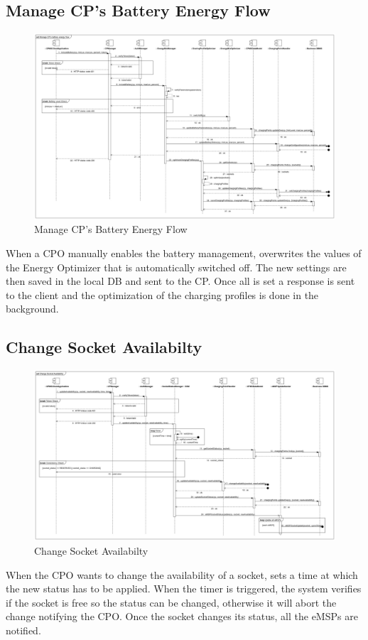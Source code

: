 \documentclass{Configuration_Files/PoliMi3i_thesis}
\begin{document}
\subsection{Manage CP's Battery Energy Flow}
\begin{figure}[H]
    \centering
    \includegraphics[width=1\textwidth]{Images/sequenceDiagrams/Manage CP battery energy flow.jpg}
    \caption{Manage CP's Battery Energy Flow}
\end{figure}
When a CPO manually enables the battery management, overwrites the values of the Energy Optimizer that is automatically switched off. The new settings are then saved in the local DB and sent to the CP. Once all is set a response is sent to the client and the optimization of the charging profiles is done in the background.

\subsection{Change Socket Availabilty}
\begin{figure}[H]
    \centering
    \includegraphics[width=1\textwidth]{Images/sequenceDiagrams/Change Socket Availability.jpg}
    \caption{Change Socket Availabilty}
\end{figure}
When the CPO wants to change the availability of a socket, sets a time at which the new status has to be applied. When the timer is triggered, the system verifies if the socket is free so the status can be changed, otherwise it will abort the change notifying the CPO. Once the socket changes its status, all the eMSPs are notified.
\end{document}
